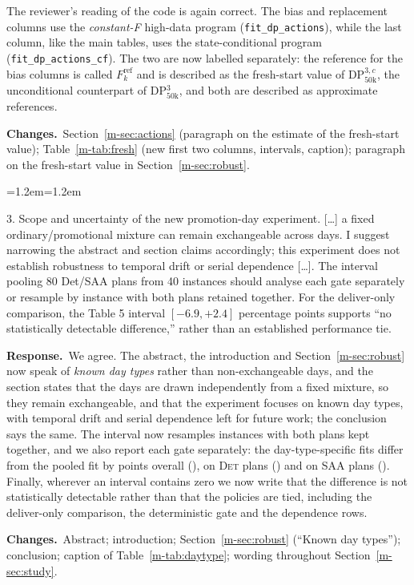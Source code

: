 \documentclass[11pt]{article}
\newenvironment{comment}{\par\medskip\noindent\color{rev}\itshape
  \begin{list}{}{\leftmargin=1.2em\rightmargin=1.2em}\item[]}%
  {\end{list}\par}
\newcommand{\resp}{\par\noindent\textbf{Response.}\ }
\newcommand{\chg}{\par\noindent\textbf{Changes.}\ }
\newcommand{\sref}[1]{Section~\ref{m-#1}}
\newcommand{\tref}[1]{Table~\ref{m-#1}}
\begin{document}
The reviewer's reading of the code is again correct. The bias and
replacement columns use the \emph{constant-F} high-data program
(\texttt{fit\_dp\_actions}), while the last column, like the main tables,
uses the state-conditional program (\texttt{fit\_dp\_actions\_cf}). The
two are now labelled separately: the reference for the bias columns is
called $F^{\mathrm{ref}}_k$ and is described as the fresh-start value of
DP$^{3,c}_{50\mathrm{k}}$, the unconditional counterpart of
DP$^3_{50\mathrm{k}}$, and both are described as approximate references.
\chg \sref{sec:actions} (paragraph on the estimate of the fresh-start
value); \tref{tab:fresh} (new first two columns, intervals, caption);
paragraph on the fresh-start value in \sref{sec:robust}.

\begin{comment}
3. Scope and uncertainty of the new promotion-day experiment. [\ldots] a
fixed ordinary/promotional mixture can remain exchangeable across days.
I suggest narrowing the abstract and section claims accordingly; this
experiment does not establish robustness to temporal drift or serial
dependence [\ldots]. The interval pooling 80 Det/SAA plans from 40
instances should analyse each gate separately or resample by instance
with both plans retained together. For the deliver-only comparison, the
Table 5 interval $[-6.9, +2.4]$ percentage points supports ``no
statistically detectable difference,'' rather than an established
performance tie.
\end{comment}
\resp We agree. The abstract, the introduction and \sref{sec:robust} now
speak of \emph{known day types} rather than non-exchangeable days, and
the section states that the days are drawn independently from a fixed
mixture, so they remain exchangeable, and that the experiment focuses
on known day types, with temporal drift and serial dependence left for
future work; the conclusion says the same. The interval now resamples instances with both
plans kept together, and we also report each gate separately: the
day-type-specific fits differ from the pooled fit by
\dtAwarePooledDelta{} points overall (\dtAwarePooledCI),
\dtAwarePooledDetDelta{} on \textsc{Det} plans (\dtAwarePooledDetCI) and
\dtAwarePooledSaaDelta{} on \textsc{SAA} plans (\dtAwarePooledSaaCI).
Finally, wherever an interval contains zero we now write that the
difference is not statistically detectable rather than that the
policies are tied, including the deliver-only comparison, the
deterministic gate and the dependence rows.
\chg Abstract; introduction; \sref{sec:robust} (``Known day types'');
conclusion; caption of \tref{tab:daytype}; wording throughout
\sref{sec:study}.
\end{document}
